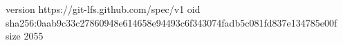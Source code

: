 version https://git-lfs.github.com/spec/v1
oid sha256:0aab9c33c27860948e614658e94493c6f343074fadb5c081fd837e134785e00f
size 2055
